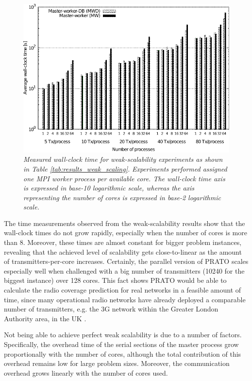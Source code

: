 \begin{figure}
\centering

\includegraphics[width=1\columnwidth]{04-framework_design_and_implementation/img/weak_scaling-time_plot}

\caption{\textit{\emph{Measured wall-clock time for weak-scalability experiments
as shown in Table \ref{tab:results_weak_scaling}.}}\textit{ }\textit{\emph{Experiments
performed assigned one MPI worker process per available core. The
wall-clock time axis is expressed in base-10 logarithmic scale, whereas
the axis representing the number of cores is expressed in base-2 logarithmic
scale.\label{fig:weak_scalability_time}}}}
\end{figure}


The time measurements observed from the weak-scalability results show
that the wall-clock times do not grow rapidly, especially when the
number of cores is more than 8. Moreover, these times are almost constant
for bigger problem instances, revealing that the achieved level of
scalability gets close-to-linear as the amount of transmitters-per-core
increases. Certainly, the parallel version of PRATO scales especially
well when challenged with a big number of transmitters (10240 for
the biggest instance) over 128 cores. This fact shows PRATO would
be able to calculate the radio coverage prediction for real networks
in a feasible amount of time, since many operational radio networks
have already deployed a comparable number of transmitters, e.g. the
3G network within the Greater London Authority area, in the UK \cite{Number_of_base_stations_in_England}. 

Not being able to achieve perfect weak scalability is due to a number
of factors. Specifically, the overhead time of the serial sections
of the master process grow proportionally with the number of cores,
although the total contribution of this overhead remains low for large
problem sizes. Moreover, the communication overhead grows linearly
with the number of cores used.

